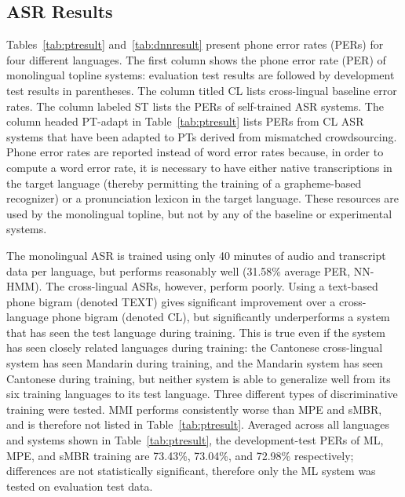 \subsection{ASR Results}
\label{s6:mlbaseline}

Tables~\ref{tab:ptresult} and~\ref{tab:dnnresult} present phone error
rates (PERs) for four different languages.  The first
column shows the phone error rate (PER) of monolingual topline
systems: evaluation test results are followed by development test
results in parentheses.  The column titled {\sc CL} lists
cross-lingual baseline error rates.  The column labeled {\sc ST} lists
the PERs of self-trained ASR systems.  The column headed {\sc
  PT-adapt} in Table~\ref{tab:ptresult} lists PERs from {\sc CL} ASR
systems that have been adapted to PTs derived from
mismatched crowdsourcing. Phone error rates are reported instead of
word error rates because, in order to compute a word error rate, it
is necessary to have either native transcriptions in the target
language (thereby permitting the training of a grapheme-based
recognizer) or a pronunciation lexicon in the target language.
These resources are used by the monolingual topline, but not by any
of the baseline or experimental systems.

The monolingual ASR is trained using only 40 minutes of audio and
transcript data per language, but performs reasonably well (31.58\%
average PER, NN-HMM).  The cross-lingual ASRs, however, perform poorly.
Using a text-based phone bigram (denoted {\sc TEXT}) gives significant
improvement over a cross-language phone bigram (denoted {\sc CL}),
but significantly underperforms a system that has seen the test
language during training.  This is true even if the system has seen
closely related languages during training: the Cantonese cross-lingual
system has seen Mandarin during training, and the Mandarin system has
seen Cantonese during training, but neither system is able to
generalize well from its six training languages to its test language.
Three different types of discriminative training were
tested.  MMI performs consistently worse than MPE and sMBR, and is
therefore not listed in Table~\ref{tab:ptresult}.  Averaged across
all languages and systems shown in Table~\ref{tab:ptresult}, the
development-test PERs of ML, MPE, and sMBR training are 73.43\%,
73.04\%, and 72.98\% respectively; differences are not statistically
significant, therefore only the ML system was tested on evaluation
test data.

